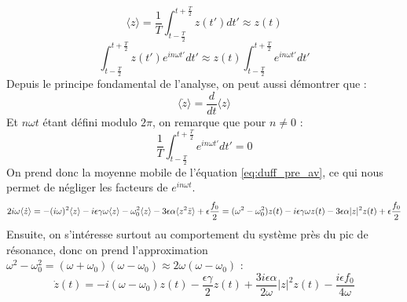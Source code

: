 \begin{equation}
    \langle z \rangle = \frac{1}{T}\int_{t-\frac{T}{2}}^{t+\frac{T}{2}}{z(t')}dt' \approx  z(t)
\end{equation}
\begin{equation}
    \int_{t-\frac{T}{2}}^{t+\frac{T}{2}}{z(t')e^{in\omega t'}}dt'  \approx z(t) \int_{t-\frac{T}{2}}^{t+\frac{T}{2}}{e^{in\omega t'}}dt'
\end{equation}
%
Depuis le principe fondamental de l'analyse, on peut aussi démontrer que :
%
\begin{equation}
    \langle \dot{z} \rangle = \frac{d}{dt} \langle z \rangle
\end{equation}
%
Et $n \omega t$ étant défini modulo $2\pi$, on remarque que pour $n \neq 0$ :
\begin{equation*}
    \frac{1}{T}\int_{t-\frac{T}{2}}^{t+\frac{T}{2}}{e^{in\omega t'}}dt' = 0
\end{equation*}
%
On prend donc la moyenne mobile de l'équation \eqref{eq:duff_pre_av}, 
ce qui nous permet de négliger les facteurs de $e^{i n\omega t}$.
\begin{dmath}
    2i\omega \langle \dot{z} \rangle = - (i\omega)^2 \langle z \rangle
    - i\epsilon\gamma\omega \langle z \rangle
    - \omega_0^2 \langle z \rangle 
    - 3 \epsilon \alpha \langle z^2 \bar{z} \rangle
    + \epsilon \frac{f_0}{2} \\
    = (\omega^2 - \omega_0^2)z(t) - i\epsilon\gamma\omega z(t) - 3\epsilon\alpha |z|^2 z(t) + \epsilon \frac{f_0}{2}
\end{dmath}
%
Ensuite, on s'intéresse surtout au comportement du système près du pic de résonance, 
donc on prend l'approximation $\omega^2 - \omega_0^2 = (\omega + \omega_0)(\omega - \omega_0) \approx 2\omega(\omega - \omega_0)$ :
%
\begin{dmath}
    \dot{z}(t) = -i(\omega - \omega_0)z(t)
    - \frac{\epsilon\gamma}{2} z(t) + \frac{3i\epsilon\alpha}{2\omega}|z|^2z(t) - \frac{i\epsilon f_0}{4\omega}
\end{dmath}
%
